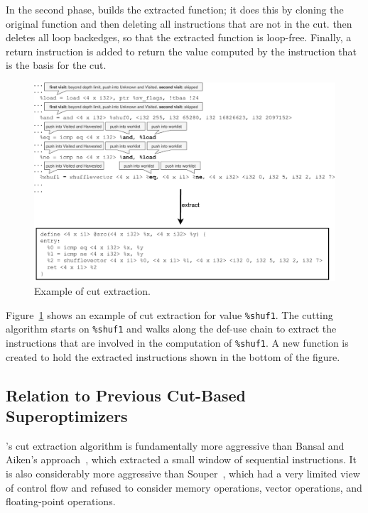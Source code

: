 In the second phase, \minotaur{} builds the extracted function; it does
this by cloning the original function and then deleting all
instructions that are not in the cut.
%
\minotaur{} then deletes all loop backedges, so that the extracted
function is loop-free.
%
Finally, a return instruction is added to return the value computed by
the instruction that is the basis for the cut.

\begin{figure}[tbp]
  \centering
  \includegraphics[width=0.8\linewidth]{figures/slice.pdf}
  \caption{Example of cut extraction.}
  \label{fig:cut}
\end{figure}


Figure~\ref{fig:cut} shows an example of cut extraction
for value \texttt{\%shuf1}.
%
The cutting algorithm starts on \texttt{\%shuf1} and walks along the
def-use chain to extract the instructions that are involved in the
computation of \texttt{\%shuf1}.
%
A new function is created to hold the extracted instructions shown
in the bottom of the figure.



\subsection{Relation to Previous Cut-Based Superoptimizers}

\minotaur's cut extraction algorithm is fundamentally more aggressive
than Bansal and Aiken's approach~\cite{Bansal06}, which extracted a
small window of sequential instructions.
%
It is also considerably more aggressive than Souper~\cite{souper},
which had a very limited view of control flow and refused to consider
memory operations, vector operations, and floating-point operations.
